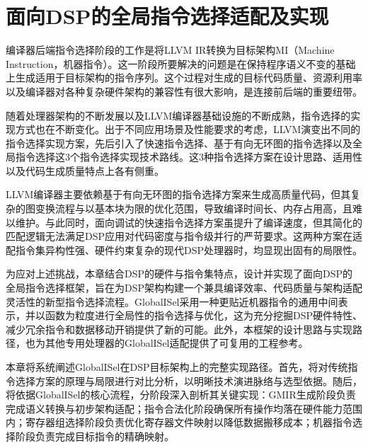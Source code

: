 \chapter{面向DSP的全局指令选择适配及实现}
编译器后端指令选择阶段的工作是将LLVM IR转换为目标架构MI（Machine Instruction，机器指令）。这一阶段所要解决的问题是在保持程序语义不变的基础上生成适用于目标架构的指令序列。这个过程对生成的目标代码质量、资源利用率以及编译器对各种复杂硬件架构的兼容性有很大影响，是连接前后端的重要纽带。

\par

随着处理器架构的不断发展以及LLVM编译器基础设施的不断成熟，指令选择的实现方式也在不断变化。出于不同应用场景及性能要求的考虑，LLVM演变出不同的指令选择实现方案，先后引入了快速指令选择、基于有向无环图的指令选择以及全局指令选择这3个指令选择实现技术路线。这3种指令选择方案在设计思路、适用性以及代码生成质量特点上各有侧重。

\par

LLVM编译器主要依赖基于有向无环图的指令选择方案来生成高质量代码，但其复杂的图变换流程与以基本块为限的优化范围，导致编译时间长、内存占用高，且难以维护。与此同时，面向调试的快速指令选择方案虽提升了编译速度，但其简化的匹配逻辑无法满足DSP应用对代码密度与指令级并行的严苛要求。这两种方案在适配指令集异构性强、硬件约束复杂的现代DSP处理器时，均显现出固有的局限性。

\par

为应对上述挑战，本章结合DSP的硬件与指令集特点，设计并实现了面向DSP的全局指令选择框架，旨在为DSP架构构建一个兼具编译效率、代码质量与架构适配灵活性的新型指令选择流程。GlobalISel采用一种更贴近机器指令的通用中间表示，并以函数为粒度进行全局性的指令选择与优化，这为充分挖掘DSP硬件特性、减少冗余指令和数据移动开销提供了新的可能。此外，本框架的设计思路与实现路径，也为其他专用处理器的GlobalISel适配提供了可复用的工程参考。

\par

本章将系统阐述GlobalISel在DSP目标架构上的完整实现路径。首先，将对传统指令选择方案的原理与局限进行对比分析，以明晰技术演进脉络与选型依据。随后，将依据GlobalISel的核心流程，分阶段深入剖析其关键实现：GMIR生成阶段负责完成语义转换与初步架构适配；指令合法化阶段确保所有操作均落在硬件能力范围内；寄存器组选择阶段负责优化寄存器文件映射以降低数据搬移成本；机器指令选择阶段负责完成目标指令的精确映射。



